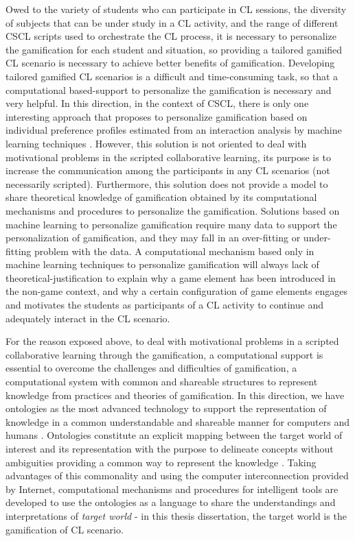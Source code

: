 Owed to the variety of students who can participate in CL sessions, the diversity of subjects that can be under study in a CL activity, and the range of different CSCL scripts used to orchestrate the CL process, it is necessary to personalize the gamification for each student and situation, so providing a tailored gamified CL scenario is necessary to achieve better benefits of gamification.
Developing tailored gamified CL scenarios is a difficult and time-consuming task, so that a computational based-support to personalize the gamification is necessary and very helpful.
In this direction, in the context of CSCL, there is only one interesting approach that proposes to personalize gamification based on individual preference profiles estimated from an interaction analysis by machine learning techniques \cite{KnutasvanRoyHynninenGranatoKasurinenIkonen2017,KnutasIkonenMaggioriniRipamontiPorras2016,KnutasIkonenNikulaPorras2014}.
However, this solution is not oriented to deal with motivational problems in the scripted collaborative learning, its purpose is to increase the communication among the participants in any CL scenarios (not necessarily scripted).
Furthermore, this solution does not provide a model to share theoretical knowledge of gamification obtained by its computational mechanisms and procedures to personalize the gamification.
Solutions based on machine learning to personalize gamification require many data to support the personalization of gamification, and they may fall in an over-fitting or under-fitting problem with the data.
A computational mechanism based only in machine learning techniques to personalize gamification will always lack of theoretical-justification to explain why a game element has been introduced in the non-game context, and why a certain configuration of game elements engages and motivates the students as participants of a CL activity to continue and adequately interact in the CL scenario.

For the reason exposed above, to deal with motivational problems in a scripted collaborative learning through the gamification, a computational support is essential to overcome the challenges and difficulties of gamification, a computational system with common and shareable structures to represent knowledge from practices and theories of gamification.
In this direction, we have ontologies as the most advanced technology to support the representation of knowledge in a common understandable and shareable manner for computers and humans \cite{AsikriLaassiriKritChaib2016, Devedzic2006, MizoguchiBourdeau2016}.
Ontologies constitute an explicit mapping between the target world of interest and its representation with the purpose to delineate concepts without ambiguities providing a common way to represent the knowledge \cite{GuarinoOberleStaab2009}.
Taking advantages of this commonality and using the computer interconnection provided by Internet, computational mechanisms and procedures for intelligent tools are developed to use the ontologies as a language to share the understandings and interpretations of \emph{target world} - in this thesis dissertation, the target world is the gamification of CL scenario.


